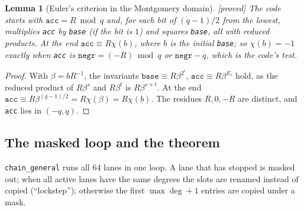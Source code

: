 \documentclass[10pt,a4paper]{article}
\newcommand{\code}[1]{\texttt{#1}}
\newcommand{\stproved}{\textsf{\small[proved]}\xspace}
\theoremstyle{plain}
\newtheorem{lemma}[proposition]{Lemma}
\theoremstyle{definition}
\begin{document}
\begin{lemma}[Euler's criterion in the Montgomery domain]\label{lem:eulermont}\stproved
The code starts with $\code{acc}=R\bmod q$ and, for each bit of $(q-1)/2$ from the lowest, multiplies \code{acc} by \code{base} (if the bit is $1$) and squares
\code{base}, all with reduced products.  At the end $\code{acc}\equiv R\chi(b)$, where $b$ is the initial \code{base}; so $\chi(b)=-1$ exactly when \code{acc} is
$\code{negr}=(-R)\bmod q$ or $\code{negr}-q$, which is the code's test.
\end{lemma}
\begin{proof}
With $\beta=bR^{-1}$, the invariants $\code{base}\equiv R\beta^{2^i}$, $\code{acc}\equiv R\beta^{E_i}$ hold, as the reduced product of $R\beta^s$ and $R\beta^t$ is
$R\beta^{s+t}$.  At the end $\code{acc}\equiv R\beta^{(q-1)/2}=R\chi(\beta)=R\chi(b)$.  The residues $R,0,-R$ are distinct, and \code{acc} lies in $(-q,q)$.
\end{proof}

\subsection{The masked loop and the theorem}

\code{chain\_general} runs all $64$ lanes in one loop.  A lane that has stopped is masked out; when all active lanes have the same degrees the slots are renamed
instead of copied (``lockstep''); otherwise the first $\max\deg+1$ entries are copied under a mask.
\end{document}
